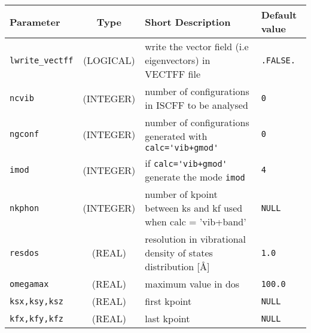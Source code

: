 \documentclass[a4paper]{article}
\begin{document}
\begin{longtable}{l|c|m{8cm}|m{2cm}}
\hline
\hline
Parameter        &  Type              &          Short Description                                                          & Default value \\
\hline
\hline
\rule[-0.75cm]{0cm}{1.5cm}
\verb?lwrite_vectff? 
                 & (LOGICAL)          & write the vector field (i.e eigenvectors) in VECTFF file                            & \verb?.FALSE.?  \\
\hline
\rule[-0.75cm]{0cm}{1.5cm}
\verb?ncvib?     & (INTEGER)          & number of configurations in ISCFF to be analysed                                    & \verb?0? \\
\hline
\rule[-0.75cm]{0cm}{1.5cm}
\verb?ngconf?    & (INTEGER)          & number of configurations generated with \verb?calc='vib+gmod'?                      & \verb?0? \\
\hline
\rule[-0.75cm]{0cm}{1.5cm}
\verb?imod?      & (INTEGER)          & if \verb?calc='vib+gmod'? generate the mode \verb?imod?                             & \verb?4? \\
\hline
\rule[-0.75cm]{0cm}{1.5cm}
\verb?nkphon?    & (INTEGER)          & number of kpoint between ks and kf used when calc = 'vib+band'                      & \verb?NULL? \\
\hline
\rule[-0.75cm]{0cm}{1.5cm}
\verb?resdos?    & (REAL)             & resolution in vibrational density of states distribution [\AA]                      & \verb?1.0? \\
\hline
\rule[-0.75cm]{0cm}{1.5cm}
\verb?omegamax?  & (REAL)             & maximum value in dos                                                                & \verb?100.0? \\
\hline
\rule[-0.75cm]{0cm}{1.5cm}
\verb?ksx,ksy,ksz?  
                 & (REAL)             & first kpoint                                                                        & \verb?NULL? \\
\hline
\rule[-0.75cm]{0cm}{1.5cm}
\verb?kfx,kfy,kfz?  
                 & (REAL)             & last kpoint                                                                         & \verb?NULL? \\
\hline
\hline
\end{longtable}

\end{document}
